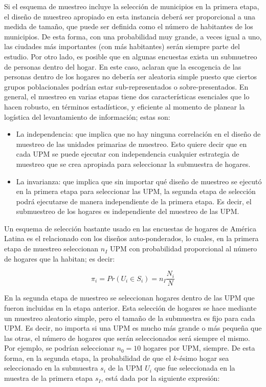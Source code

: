 \documentclass[
  10pt,
  spanish,
]{book}
\providecommand{\tightlist}{%
  \setlength{\itemsep}{0pt}\setlength{\parskip}{0pt}}
\begin{document}
Si el esquema de muestreo incluye la selección de municipios en la primera etapa, el diseño de muestreo apropiado en esta instancia deberá ser proporcional a una medida de tamaño, que puede ser definida como el número de habitantes de los municipios. De esta forma, con una probabilidad muy grande, a veces igual a uno, las ciudades más importantes (con más habitantes) serán siempre parte del estudio. Por otro lado, es posible que en algunas encuestas exista un submuetreo de personas dentro del hogar. En este caso, \citet{Clark_Steel_2007} aclaran que la escogencia de las personas dentro de los hogares no debería ser aleatoria simple puesto que ciertos grupos poblacionales podrían estar sub-representados o sobre-presentados. En general, el muestreo en varias etapas tiene dos características esenciales que lo hacen robusto, en términos estadísticos, y eficiente al momento de planear la logística del levantamiento de información; estas son:

\begin{itemize}
\tightlist
\item
  La independencia: que implica que no hay ninguna correlación en el diseño de muestreo de las unidades primarias de muestreo. Esto quiere decir que en cada UPM se puede ejecutar con independencia cualquier estrategia de muestreo que se crea apropiada para seleccionar la submuestra de hogares.
\item
  La invarianza: que implica que sin importar qué diseño de muestreo se ejecutó en la primera etapa para seleccionar las UPM, la segunda etapa de selección podrá ejecutarse de manera independiente de la primera etapa. Es decir, el submuestreo de los hogares es independiente del muestreo de las UPM.
\end{itemize}

Un esquema de selección bastante usado en las encuestas de hogares de América Latina es el relacionado con los diseños auto-ponderados, lo cuales, en la primera etapa de muestreo seleccionan \(n_I\) UPM con probabilidad proporcional al número de hogares que la habitan; es decir:

\[\pi_i = Pr(U_i \in S_i) = n_I \frac{N_i}{N}\]

En la segunda etapa de muestreo se seleccionan hogares dentro de las UPM que fueron incluidas en la etapa anterior. Esta selección de hogares se hace mediante un muestreo aleatorio simple, pero el tamaño de la submuestra es fijo para cada UPM. Es decir, no importa si una UPM es mucho más grande o más pequeña que las otras, el número de hogares que serán seleccionados será siempre el mismo. Por ejemplo, se podrían seleccionar \(n_0 = 10\) hogares por UPM, siempre. De esta forma, en la segunda etapa, la probabilidad de que el \(k\)-ésimo hogar sea seleccionado en la submuestra \(s_i\) de la UPM \(U_i\) que fue seleccionada en la muestra de la primera etapa \(s_I\), está dada por la siguiente expresión:
\end{document}
